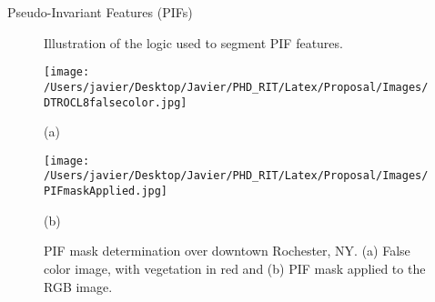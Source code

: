 \documentclass{beamer}
\begin{document}
\begin{frame}{}
\begin{columns}[t]
\begin{column}{.3\linewidth}
\begin{block}{Pseudo-Invariant Features (PIFs)}
\begin{figure}[htb]
{
  }%
\caption{Illustration of the logic used to segment PIF features. \label{fig:PIFflowchart}}
\end{figure}
\vspace{1cm}
\begin{figure}[htb]
  \begin{minipage}[c]{0.48\linewidth}
    \centering
      \texttt{[image: /Users/javier/Desktop/Javier/PHD\_RIT/Latex/Proposal/Images/DTROCL8falsecolor.jpg]}  
    \vspace{.5cm}
    \centerline{(a)}\medskip
  \end{minipage}
  \hfill
  \begin{minipage}[d]{0.48\linewidth}
    \centering
      \texttt{[image: /Users/javier/Desktop/Javier/PHD\_RIT/Latex/Proposal/Images/PIFmaskApplied.jpg]}
    \vspace{.5cm}
    \centerline{(b)}\medskip
  \end{minipage}
  \caption{PIF mask determination over downtown Rochester, NY. (a) False color image, with vegetation in red and (b) PIF mask applied to the RGB image. \label{fig:PIFmask} } 
\end{figure}



\end{block}
\end{column}
\end{columns}
\end{frame}
\end{document}
